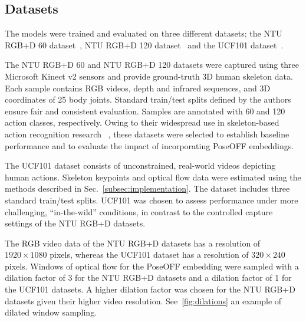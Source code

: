 \documentclass[letterpaper, 10 pt, conference]{ieeeconf}
\begin{document}
\subsection{Datasets}
\label{subsec:datasets}
The models were trained and evaluated on three different datasets; the NTU RGB+D 60 dataset~\cite{shahroudy2016NTURGB+DLargeScaleDataset3DHumanActivityAnalysis}, NTU RGB+D 120 dataset~\cite{liu2020NTURGB+D120LargeScaleBenchmark3DHumanActivityUnderstanding} and the UCF101 dataset~\cite{soomro2012UCF101dataset101humanactionsclassesvideoswild}.

The NTU RGB+D 60 and NTU RGB+D 120 datasets were captured using three Microsoft Kinect v2 sensors and provide ground-truth 3D human skeleton data.
Each sample contains RGB videos, depth and infrared sequences, and 3D coordinates of 25 body joints.
Standard train/test splits defined by the authors ensure fair and consistent evaluation.
Samples are annotated with 60 and 120 action classes, respectively.
Owing to their widespread use in skeleton-based action recognition research ~\cite{chi2025InfoGCNLearningRepresentationPredictingFutureOnlineSkeletonBasedActionRecognition, duan2022PYSKLGoodPracticesSkeletonActionRecognition, liu2020DisentanglingUnifyingGraphConvolutionsSkeletonBasedActionRecognition}, these datasets were selected to establish baseline performance and to evaluate the impact of incorporating PoseOFF embeddings.

The UCF101 dataset consists of unconstrained, real-world videos depicting human actions.
Skeleton keypoints and optical flow data were estimated using the methods described in Sec.~\ref{subsec:implementation}.
The dataset includes three standard train/test splits.
UCF101 was chosen to assess performance under more challenging, ``in-the-wild'' conditions, in contrast to the controlled capture settings of the NTU RGB+D datasets.

The RGB video data of the NTU RGB+D datasets has a resolution of $1920\times1080$ pixels, whereas the UCF101 dataset has a resolution of $320\times240$ pixels.
Windows of optical flow for the PoseOFF embedding were sampled with a dilation factor of 3 for the NTU RGB+D datasets and a dilation factor of 1 for the UCF101 datasets.
A higher dilation factor was chosen for the NTU RGB+D datasets given their higher video resolution.
See~\autoref{fig:dilations} an example of dilated window sampling.
\end{document}
